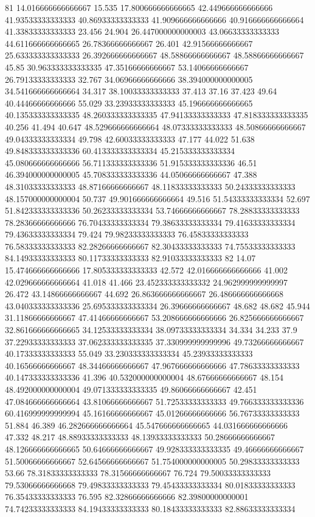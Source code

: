 81 14.016666666666667 15.535 17.800666666666665 42.449666666666666 41.93533333333333 40.86933333333333 41.909666666666666 40.916666666666664 41.33833333333333 23.456 24.904 26.447000000000003 43.06633333333333 44.611666666666665 26.78366666666667 26.401 42.91566666666667 25.633333333333333 26.392666666666667 48.58866666666667 48.58866666666667 45.85 30.963333333333335 47.35166666666667 53.14066666666667 26.79133333333333 32.767 34.06966666666666 38.394000000000005 34.541666666666664 34.317 38.10033333333333 37.413 37.16 37.423 49.64 40.44466666666666 55.029 33.23933333333333 45.196666666666665 40.135333333333335 48.260333333333335 47.94133333333333 47.818333333333335 40.256 41.494 40.647 48.529666666666664 48.07333333333333 48.50866666666667 49.04333333333334 49.798 42.60033333333333 47.177 44.022 51.638 49.848333333333336 60.413333333333334 45.215333333333334 45.080666666666666 56.711333333333336 51.915333333333336 46.51 46.394000000000005 45.708333333333336 44.05066666666667 47.388 48.31033333333333 48.87166666666667 48.11833333333333 50.24333333333333 48.157000000000004 50.737 49.901666666666664 49.516 51.54333333333334 52.697 51.842333333333336 50.26233333333334 53.74666666666667 78.28833333333333 78.28366666666666 76.70433333333334 79.38633333333334 79.41633333333334 79.43633333333334 79.424 79.98233333333333 76.45833333333333 76.58333333333333 82.28266666666667 82.30433333333333 74.75533333333333 84.14933333333333 80.11733333333333 82.91033333333333
82 14.07 15.474666666666666 17.805333333333333 42.572 42.016666666666666 41.002 42.029666666666664 41.018 41.466 23.452333333333332 24.962999999999997 26.472 43.14866666666667 44.692 26.863666666666667 26.486666666666668 43.040333333333336 25.695333333333334 26.39666666666667 48.682 48.682 45.944 31.11866666666667 47.41466666666667 53.208666666666666 26.825666666666667 32.861666666666665 34.12533333333334 38.09733333333334 34.334 34.233 37.9 37.22933333333333 37.062333333333335 37.330999999999996 49.73266666666667 40.17333333333333 55.049 33.230333333333334 45.23933333333333 40.16566666666667 48.34466666666667 47.967666666666666 47.78633333333333 40.147333333333336 41.396 40.532000000000004 48.67666666666667 48.154 48.492000000000004 49.071333333333335 49.86066666666667 42.451 47.084666666666664 43.81066666666667 51.72533333333333 49.766333333333336 60.416999999999994 45.16166666666667 45.01266666666666 56.76733333333333 51.884 46.389 46.282666666666664 45.547666666666665 44.031666666666666 47.332 48.217 48.88933333333333 48.13933333333333 50.28666666666667 48.126666666666665 50.64666666666667 49.928333333333335 49.46666666666667 51.50066666666667 52.64566666666667 51.754000000000005 50.29833333333333 53.66 78.31833333333333 78.31566666666667 76.724 79.50033333333333 79.53066666666668 79.49833333333333 79.45433333333334 80.01833333333333 76.35433333333333 76.595 82.32866666666666 82.39800000000001 74.74233333333333 84.19433333333333 80.18433333333333 82.88633333333334
